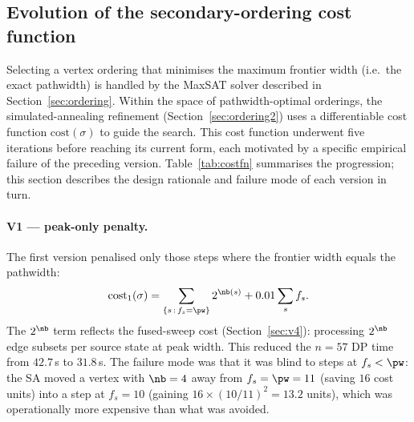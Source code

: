 

\subsection{Evolution of the secondary-ordering cost function}
\label{sec:costfn-evolution}

Selecting a vertex ordering that minimises the maximum frontier width
(i.e.\ the exact pathwidth) is handled by the MaxSAT solver described
in Section~\ref{sec:ordering}.
Within the space of pathwidth-optimal orderings, the simulated-annealing
refinement (Section~\ref{sec:ordering2}) uses a differentiable cost
function $\mathrm{cost}(\sigma)$ to guide the search.
This cost function underwent five iterations before reaching its current
form, each motivated by a specific empirical failure of the preceding
version.
Table~\ref{tab:costfn} summarises the progression; this section
describes the design rationale and failure mode of each version in turn.

\paragraph{V1 — peak-only penalty.}
The first version penalised only those steps where the frontier width
equals the pathwidth:
\[
  \mathrm{cost}_1(\sigma)
    = \sum_{\{s\,:\,f_s = \pw\}} 2^{\nb(s)}
      + 0.01 \sum_s f_s.
\]
The $2^{\nb}$ term reflects the fused-sweep cost (Section~\ref{sec:v4}):
processing $2^{\nb}$ edge subsets per source state at peak width.
This reduced the $n=57$ DP time from $42.7$\,s to $31.8$\,s.
The failure mode was that it was blind to steps at $f_s < \pw$: the SA
moved a vertex with $\nb=4$ away from $f_s = \pw = 11$ (saving $16$
cost units) into a step at $f_s = 10$ (gaining $16 \times (10/11)^2 =
13.2$ units), which was operationally more expensive than what was
avoided.

